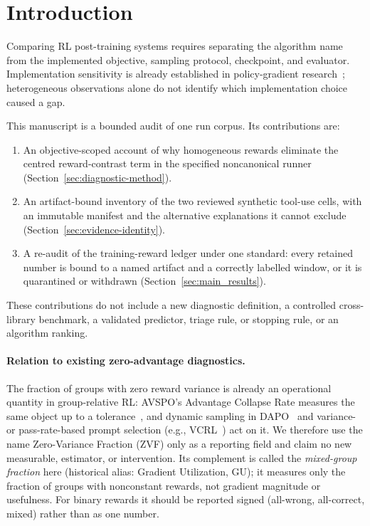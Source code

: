 \section{Introduction}
\label{sec:intro}
Comparing RL post-training systems requires separating the algorithm name from
the implemented objective, sampling protocol, checkpoint, and evaluator.
Implementation sensitivity is already established in policy-gradient
research~\citep{engstrom2020implementation,henderson2018deep}; heterogeneous
observations alone do not identify which implementation choice caused a gap.

This manuscript is a bounded audit of one run corpus. Its contributions are:
\begin{enumerate}
\item An objective-scoped account of why homogeneous rewards eliminate the
centred reward-contrast term in the specified noncanonical runner
(Section~\ref{sec:diagnostic-method}).
\item An artifact-bound inventory of the two reviewed synthetic tool-use cells,
with an immutable manifest and the alternative explanations it cannot exclude
(Section~\ref{sec:evidence-identity}).
\item A re-audit of the training-reward ledger under one standard: every
retained number is bound to a named artifact and a correctly labelled window,
or it is quarantined or withdrawn (Section~\ref{sec:main_results}).
\end{enumerate}
These contributions do not include a new diagnostic definition, a controlled
cross-library benchmark, a validated predictor, triage rule, or stopping rule,
or an algorithm ranking.

\paragraph{Relation to existing zero-advantage diagnostics.}
The fraction of groups with zero reward variance is already an operational
quantity in group-relative RL: AVSPO's Advantage Collapse Rate measures the
same object up to a tolerance~\citep{he2026advantage}, and dynamic sampling in
DAPO~\citep{yu2025dapo} and variance- or pass-rate-based prompt selection
(e.g., VCRL~\citep{jiang2025vcrl}) act on it. We therefore use the name
Zero-Variance Fraction (ZVF) only as a reporting field and claim no new
measurable, estimator, or intervention. Its complement is called the
\emph{mixed-group fraction} here (historical alias: Gradient Utilization, GU);
it measures only the fraction of groups with nonconstant rewards, not gradient
magnitude or usefulness. For binary rewards it should be reported signed
(all-wrong, all-correct, mixed) rather than as one number.

